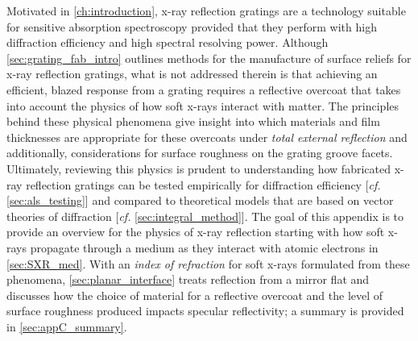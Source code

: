 \label{app:x-ray_materials} 
Motivated in \cref{ch:introduction}, x-ray reflection gratings are a technology suitable for sensitive absorption spectroscopy provided that they perform with high diffraction efficiency and high spectral resolving power. 
Although \cref{sec:grating_fab_intro} outlines methods for the manufacture of surface reliefs for x-ray reflection gratings, what is not addressed therein is that achieving an efficient, blazed response from a grating requires a reflective overcoat that takes into account the physics of how soft x-rays interact with matter. 
The principles behind these physical phenomena give insight into which materials and film thicknesses are appropriate for these overcoats under \emph{total external reflection} and additionally, considerations for surface roughness on the grating groove facets. 
Ultimately, reviewing this physics is prudent to understanding how fabricated x-ray reflection gratings can be tested empirically for diffraction efficiency [\emph{cf.\@} \cref{sec:als_testing}] and compared to theoretical models that are based on vector theories of diffraction [\emph{cf.\@} \cref{sec:integral_method}]. 
The goal of this appendix is to provide an overview for the physics of x-ray reflection starting with how soft x-rays propagate through a medium as they interact with atomic electrons in \cref{sec:SXR_med}. 
With an \emph{index of refraction} for soft x-rays formulated from these phenomena, \cref{sec:planar_interface} treats reflection from a mirror flat and discusses how the choice of material for a reflective overcoat and the level of surface roughness produced impacts specular reflectivity; a summary is provided in \cref{sec:appC_summary}. 

